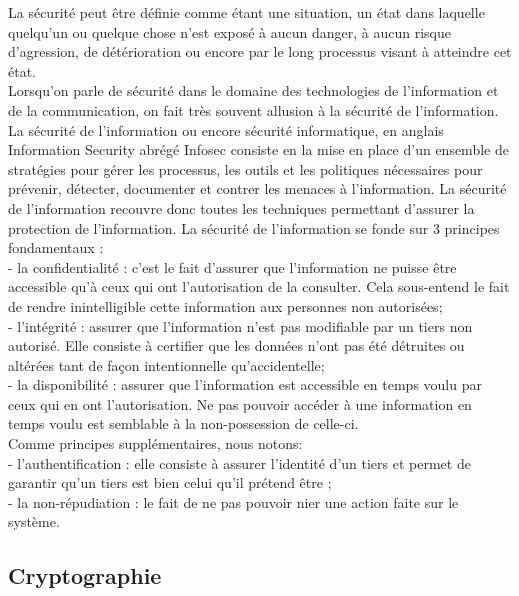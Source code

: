 La sécurité peut être définie comme étant une situation, un état dans laquelle quelqu’un ou quelque chose n’est exposé à aucun danger, à aucun risque d’agression, de détérioration ou encore par le long processus visant à atteindre cet état. \\
Lorsqu’on parle de sécurité dans le domaine des technologies de l’information et de la communication, on fait très souvent allusion à la sécurité de l’information. La sécurité de l'information ou encore sécurité informatique, en anglais Information Security abrégé Infosec consiste en la mise en place d’un ensemble de stratégies pour gérer les processus, les outils et les politiques nécessaires pour prévenir, détecter, documenter et contrer les menaces à l'information. La sécurité de l’information recouvre donc toutes les techniques permettant d’assurer la protection de l’information.  La sécurité de l’information se fonde sur 3 principes fondamentaux : \\
-	la confidentialité : c’est le fait d’assurer que l’information ne puisse être accessible qu’à ceux qui ont l’autorisation de la consulter. Cela sous-entend le fait de rendre inintelligible cette information aux personnes non autorisées; \\
-	l’intégrité : assurer que l’information n’est pas modifiable par un tiers non autorisé. Elle consiste à certifier que les données n’ont pas été détruites ou altérées tant de façon intentionnelle qu’accidentelle; \\
-	la disponibilité : assurer que l’information est accessible en temps voulu par ceux qui en ont l’autorisation. Ne pas pouvoir accéder à une information en temps voulu est semblable à la non-possession de celle-ci.\\
Comme principes supplémentaires, nous notons:\\
-	l’authentification : elle consiste à assurer l’identité d’un tiers et permet de garantir qu’un tiers est bien celui qu’il prétend être ;\\
-	la non-répudiation : le fait de ne pas pouvoir nier une action faite sur le système.

\subsection{Cryptographie}

